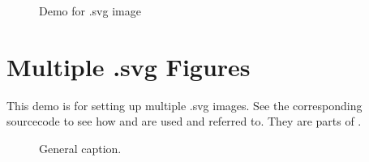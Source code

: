 \begin{figure}[htbp]
  \centering
  
  
  \caption{Demo for .svg image}
  \label{fig:svg}

\end{figure}

\section{Multiple .svg Figures}

This demo is for setting up multiple .svg images. See the corresponding sourcecode to see how  and  are used and referred to. They are parts of .

\begin{figure}[htbp]
\centering
\begin{minipage}{0.45\textwidth}
  \centering
\label{fig:multisvg1}
\end{minipage}%
\begin{minipage}{0.45\textwidth}
  \centering
\label{fig:multisvg2}
\end{minipage}
\caption{General caption.} \label{fig:multiplesvg}
\end{figure}

\endinput